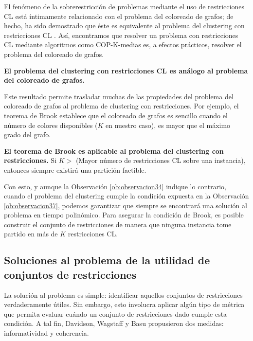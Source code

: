 El fenómeno de la sobrerestricción de problemas mediante el uso de restricciones \acf{CL} está íntimamente relacionado con el problema del coloreado de grafos; de hecho, ha sido demostrado que éste es equivalente al problema del clustering con restricciones \acs{CL} \cite{DavidsonRavi:2006}. Así, encontramos que resolver un problema con restricciones \acs{CL} mediante algoritmos como COP-K-medias es, a efectos prácticos, resolver el problema del coloreado de grafos.

\begin{observacion}
	
	\textbf{El problema del clustering con restricciones \acs{CL} es análogo al problema del coloreado de grafos.} \cite{Survey:2007}
	
\end{observacion}

Este resultado permite trasladar muchas de las propiedades del problema del coloreado de grafos al problema de clustering con restricciones. Por ejemplo, el teorema de Brook establece que el coloreado de grafos es sencillo cuando el número de colores disponibles ($K$ en nuestro caso), es mayor que el máximo grado del grafo. 

\begin{observacion}
	
	\textbf{El teorema de Brook es aplicable al problema del clustering con restricciones.}
	Si $ K > $ (Mayor número de restricciones \acs{CL} sobre una instancia), entonces siempre existirá una partición factible. \cite{Survey:2007} \label{ob:observacion37}
	
\end{observacion}

Con esto, y aunque la Observación \ref{ob:observacion34} indique lo contrario, cuando el problema del clustering cumple la condición expuesta en la Observación \ref{ob:observacion37}, podemos garantizar que siempre se encontrará una solución al problema en tiempo polinómico. Para asegurar la condición de Brook, es posible construir el conjunto de restricciones de manera que ninguna instancia tome partido en más de $K$ restricciones \acf{CL}. \cite{DavidsonRavi:2006}

\subsection{Soluciones al problema de la utilidad de conjuntos de restricciones}

La solución al problema es simple: identificar aquellos conjuntos de restricciones verdaderamente útiles. Sin embargo, esto involucra aplicar algún tipo de métrica que permita evaluar cuándo un conjunto de restricciones dado cumple esta condición. A tal fin, Davidson, Wagstaff y Basu propusieron dos medidas: informatividad y coherencia.\\


